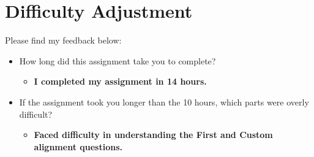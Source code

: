 \documentclass{article}
\begin{document}

\section{Difficulty Adjustment}
Please find my feedback below: 
\begin{itemize}
    \item  How long did this assignment take you to complete?
    \begin{itemize}
        \item \textbf{I completed my assignment in 14 hours.}
    \end{itemize}
    \item  If the assignment took you longer than the 10 hours, which parts were overly difficult?
    \begin{itemize}
        \item \textbf{Faced difficulty in understanding the First and Custom alignment questions.}
    \end{itemize}
\end{itemize}
\end{document}
